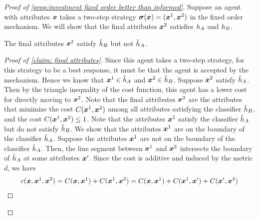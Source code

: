 \begin{proof}[Proof of \cref{prop:investment fixed order better than informed}]
    
    Suppose an agent with attributes $\boldsymbol{x}$ takes a two-step strategy $\boldsymbol{\sigma}(\boldsymbol{x})=( \boldsymbol{x}^1, \boldsymbol{x}^2)$ in the fixed order mechanism.
    We will show that the final attributes $\boldsymbol{x}^2$ satisfies $h_A$ and $h_B$. 
 
    \begin{claim}\label{claim: final attributes}
        The final attributes $\boldsymbol{x}^2$ satisfy $\tilde {h}_B$ but not $\tilde {h}_A$. 
    \end{claim}

    \begin{proof}[Proof of \cref{claim: final attributes}]
        Since this agent takes a two-step strategy,
    for this strategy to be a best response, it must be that the agent is accepted by the mechanism.
    Hence we know that $\boldsymbol{x}^1\in\tilde {h}_A$ and $\boldsymbol{x}^2\in \tilde{h}_B$.
    Suppose $\boldsymbol{x}^2$ satisfy $\tilde{h}_A$.
    Then  by the triangle inequality of the cost function, this agent has a lower cost for directly moving to $\boldsymbol{x}^2$.
    Note that the final attributes $\boldsymbol{x}^2$ are the attributes that minimize the cost $C(\boldsymbol{x}^1,\boldsymbol{x}^2)$ among all attributes satisfying the classifier $\tilde{h}_B$, and the cost $C(\boldsymbol{x}^1,\boldsymbol{x}^2) \leq 1$. 
    Note that the attributes $\boldsymbol{x}^1$ satisfy the classifier $\tilde {h}_A$ but do not satisfy $\tilde {h}_B$. 
    We show that the attributes $\boldsymbol{x}^1$ are on the boundary of the classifier $\tilde{h}_A$. 
    Suppose the attributes $\boldsymbol{x}^1$ are not on the boundary of the classifier $\tilde{h}_A$. 
    Then, the line segment between $\boldsymbol{x}^1$ and $\boldsymbol{x}^2$ intersects the boundary of $\tilde {h}_A$ at some attributes $\boldsymbol{x}'$. 
    Since the cost is additive and induced by the metric $d$, we have
    \begin{align*}
        c(\features,\firstfeatures,\secondfeatures) &= \onecost(\features,\firstfeatures) + \onecost(\firstfeatures,\secondfeatures) = \onecost(\features,\firstfeatures) + \onecost(\firstfeatures, \features') + \onecost(\features', \secondfeatures) \\

\end{align*}
\end{proof}
\end{proof}
